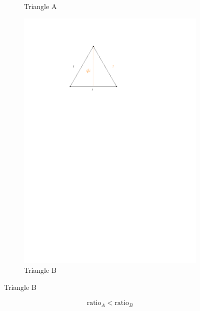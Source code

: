 \begin{figure}[H]
\begin{subfigure}{0.4\textwidth}
		\caption*{Triangle A}
	\end{subfigure}
	\begin{subfigure}{0.4\textwidth}
	\centering
	\includegraphics[page=3]{drawings/previous-results.pdf}
	\caption*{Triangle B}
\end{subfigure}
\end{figure}
\begin{align*}
	\text{ratio}_A < \text{ratio}_B
\end{align*}

